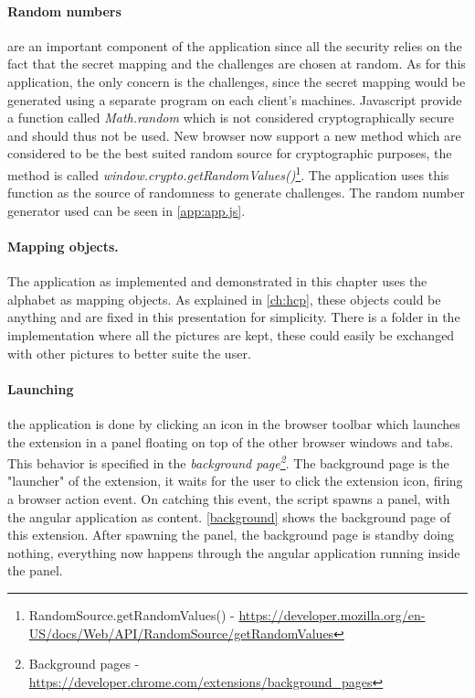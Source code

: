 \paragraph{Random numbers} are an important component of the application since all the security relies on the fact that the secret mapping and the challenges are chosen at random. As for this application, the only concern is the challenges, since the secret mapping would be generated using a separate program on each client's machines. Javascript provide a function called \emph{Math.random} which is not considered cryptographically secure~\cite{js-crypto} and should thus not be used. New browser now support a new method which are considered to be the best suited random source for cryptographic purposes, the method is called \emph{window.crypto.getRandomValues()}\footnote{RandomSource.getRandomValues() - \url{https://developer.mozilla.org/en-US/docs/Web/API/RandomSource/getRandomValues}}. The application uses this function as the source of randomness to generate challenges. The random number generator used can be seen in \autoref{app:app.js}.

\paragraph{Mapping objects.} The application as implemented and demonstrated in this chapter uses the alphabet as mapping objects. As explained in \autoref{ch:hcp}, these objects could be anything and are fixed in this presentation for simplicity. There is a folder in the implementation where all the pictures are kept, these could easily be exchanged with other pictures to better suite the user. 

\paragraph{Launching} the application is done by clicking an icon in the browser toolbar which launches the extension in a panel floating on top of the other browser windows and tabs. This behavior is specified in the \emph{background page\footnote{Background pages - \url{https://developer.chrome.com/extensions/background_pages}}}. The background page is the "launcher" of the extension, it waits for the user to click the extension icon, firing a browser action event. On catching this event, the script spawns a panel, with the angular application as content. \autoref{background} shows the background page of this extension. After spawning the panel, the background page is standby doing nothing, everything now happens through the angular application running inside the panel. 

